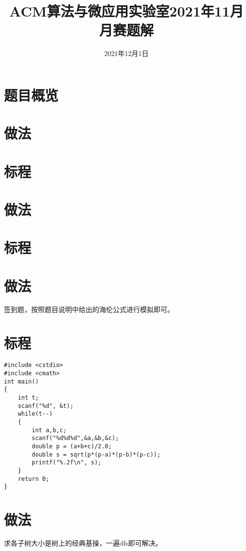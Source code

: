 \documentclass{ctsol}
\title{ACM算法与微应用实验室2021年11月月赛题解}
\date{2021年12月1日}
\begin{document}
\maketitle
{}

\section*{题目概览}
\solutiontab

\makesolution
\section*{做法}
\section*{标程}

\makesolution
\section*{做法}
\section*{标程}

\makesolution
\section*{做法}
签到题，按照题目说明中给出的海伦公式进行模拟即可。

\section*{标程}
\begin{lstlisting}
#include <cstdio>
#include <cmath>
int main()
{
    int t;
    scanf("%d", &t);
    while(t--)
    {
        int a,b,c;
        scanf("%d%d%d",&a,&b,&c);
        double p = (a+b+c)/2.0;
        double s = sqrt(p*(p-a)*(p-b)*(p-c));
        printf("%.2f\n", s);
    }
    return 0;
}
\end{lstlisting}

\makesolution
\section*{做法}
求各子树大小是树上的经典基操，一遍dfs即可解决。
\end{document}
